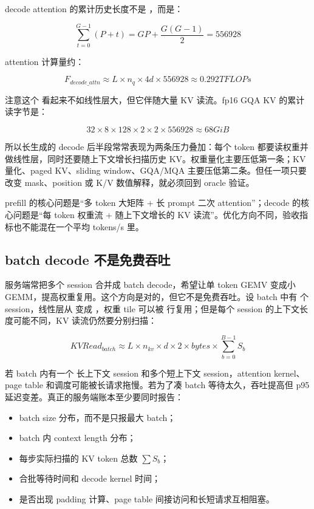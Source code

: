 decode attention 的累计历史长度不是 ，而是：

\[
\sum_{t=0}^{G-1}(P+t)=GP+\frac{G(G-1)}{2}=556928
\]

attention 计算量约：

\[
F_{decode\_attn}\approx L\times n_q\times4d\times556928\approx0.292TFLOPs
\]

注意这个  看起来不如线性层大，但它伴随大量 KV 读流。fp16 GQA KV 的累计读字节是：

\[
32\times8\times128\times2\times2\times556928
\approx 68GiB
\]

所以长生成的 decode 后半段常常表现为两条压力叠加：每个 token 都要读权重并做线性层，同时还要随上下文增长扫描历史 KV。权重量化主要压低第一条；KV 量化、paged KV、sliding window、GQA/MQA 主要压低第二条。但任一项只要改变 mask、position 或 K/V 数值解释，就必须回到 oracle 验证。

\begin{keyidea}
prefill 的核心问题是“多 token 大矩阵 + 长 prompt 二次 attention”；decode 的核心问题是“每 token 权重流 + 随上下文增长的 KV 读流”。优化方向不同，验收指标也不能混在一个平均 tokens/s 里。
\end{keyidea}

\subsection{batch decode 不是免费吞吐}

服务端常把多个 session 合并成 batch decode，希望让单 token GEMV 变成小 GEMM，提高权重复用。这个方向是对的，但它不是免费吞吐。设 batch 中有  个 session，线性层从 \code{[1,H]} 变成 \code{[B,H]}，权重 tile 可以被  行复用；但是每个 session 的上下文长度可能不同，KV 读流仍然要分别扫描：

\[
KVRead_{batch}
\approx
L\times n_{kv}\times d\times2\times bytes
\times \sum_{b=0}^{B-1}S_b
\]

若 batch 内有一个  长上下文 session 和多个短上下文 session，attention kernel、page table 和调度可能被长请求拖慢。若为了凑 batch 等待太久，吞吐提高但 p95 延迟变差。真正的服务端账本至少要同时报告：

\begin{itemize}
  \item batch size 分布，而不是只报最大 batch；
  \item batch 内 context length 分布；
  \item 每步实际扫描的 KV token 总数 \(\sum S_b\)；
  \item 合批等待时间和 decode kernel 时间；
  \item 是否出现 padding 计算、page table 间接访问和长短请求互相阻塞。
\end{itemize}

